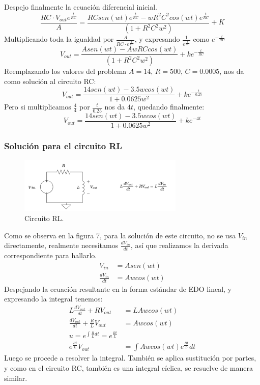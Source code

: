\documentclass{article}
\begin{document}
Despejo finalmente la ecuación diferencial inicial.
\[
    \frac{RC\cdot V_{out}e^{\frac{t}{RC}}}{A}=\frac{RCsen(wt)e^{\frac{t}{RC}}-wR^2C^2cos(wt)e^{\frac{t}{RC}}}{(1+R^2C^2w^2)}+K
\]
Multiplicando toda la igualdad por \(\frac{A}{RC\cdot e^{\frac{t}{RC}}}\), y expresando \(\frac{1}{e^{\frac{t}{RC}}}\) como \(e^{-\frac{t}{RC}}\)
\[
    V_{out}=\frac{Asen(wt)-AwRCcos(wt)}{(1+R^2C^2w^2)}+ke^{-\frac{t}{RC}}
\]
Reemplazando los valores del problema \(A=14,\,R=500,\,C=0.0005\), nos da como solución al circuito RC:
\[
    V_{out}=\frac{14sen(wt)-3.5wcos(wt)}{1+0.0625w^2}+ke^{-\frac{t}{0.25}}
\]
Pero si multiplicamos \(\frac{4}{4}\) por \(\frac{t}{0.25}\) nos da \(4t\), quedando finalmente:
\[
    V_{out}=\frac{14sen(wt)-3.5wcos(wt)}{1+0.0625w^2}+ke^{-4t}
\]
\subsubsection{Solución para el circuito RL}
\begin{figure}[H]
    \centering
    \includegraphics[width=0.7\textwidth]{CirtoRL.png}
    \caption{Circuito RL.}
    \label{fig:CirctoRL}
\end{figure}
Como se observa en la figura 7, para la solución de este circuito, no se usa \(V_{in}\) directamente, realmente necesitamos \(\frac{dV_{in}}{dt}\), así que realizamos la derivada correspondiente para hallarlo.
\begin{align*}
    V_{in}&=Asen(wt) \\
    \frac{dV_{in}}{dt}&=Awcos(wt)
\end{align*}
Despejando la ecuación resultante en la forma estándar de EDO lineal, y expresando la integral tenemos:
\begin{align*}
    L\frac{dV_{out}}{dt}+RV_{out}&=LAwcos(wt) \\
    \frac{dV_{out}}{dt}+\frac{R}{L}V_{out}&=Awcos(wt) \\
    u=e^{\int \frac{R}{L}dt}=e^{\frac{Rt}{L}} \\
    e^{\frac{Rt}{L}}V_{out}&=\int Awcos(wt)e^{\frac{Rt}{L}}dt
\end{align*}
Luego se procede a resolver la integral. También se aplica sustitución por partes, y como en el circuito RC, también es una integral cíclica, se resuelve de manera similar.
\end{document}
